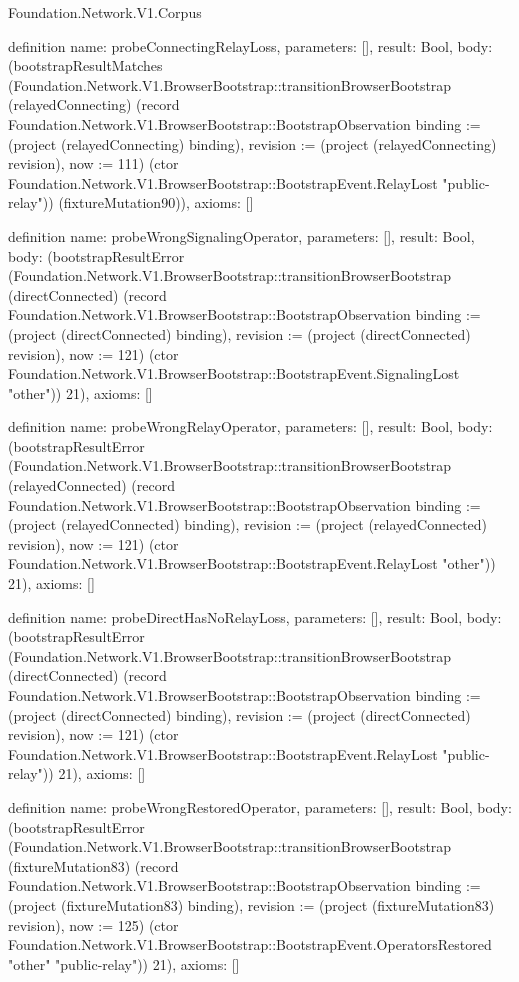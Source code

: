 \begin{lexlean}{Foundation.Network.V1.Corpus}
\begin{semanticmodule}
definition{
  name: probeConnectingRelayLoss,
  parameters: [],
  result: Bool,
  body: (bootstrapResultMatches (Foundation.Network.V1.BrowserBootstrap::transitionBrowserBootstrap (relayedConnecting) (record Foundation.Network.V1.BrowserBootstrap::BootstrapObservation {binding := (project (relayedConnecting) binding), revision := (project (relayedConnecting) revision), now := 111}) (ctor Foundation.Network.V1.BrowserBootstrap::BootstrapEvent.RelayLost "public-relay")) (fixtureMutation90)),
  axioms: []
}

definition{
  name: probeWrongSignalingOperator,
  parameters: [],
  result: Bool,
  body: (bootstrapResultError (Foundation.Network.V1.BrowserBootstrap::transitionBrowserBootstrap (directConnected) (record Foundation.Network.V1.BrowserBootstrap::BootstrapObservation {binding := (project (directConnected) binding), revision := (project (directConnected) revision), now := 121}) (ctor Foundation.Network.V1.BrowserBootstrap::BootstrapEvent.SignalingLost "other")) 21),
  axioms: []
}

definition{
  name: probeWrongRelayOperator,
  parameters: [],
  result: Bool,
  body: (bootstrapResultError (Foundation.Network.V1.BrowserBootstrap::transitionBrowserBootstrap (relayedConnected) (record Foundation.Network.V1.BrowserBootstrap::BootstrapObservation {binding := (project (relayedConnected) binding), revision := (project (relayedConnected) revision), now := 121}) (ctor Foundation.Network.V1.BrowserBootstrap::BootstrapEvent.RelayLost "other")) 21),
  axioms: []
}

definition{
  name: probeDirectHasNoRelayLoss,
  parameters: [],
  result: Bool,
  body: (bootstrapResultError (Foundation.Network.V1.BrowserBootstrap::transitionBrowserBootstrap (directConnected) (record Foundation.Network.V1.BrowserBootstrap::BootstrapObservation {binding := (project (directConnected) binding), revision := (project (directConnected) revision), now := 121}) (ctor Foundation.Network.V1.BrowserBootstrap::BootstrapEvent.RelayLost "public-relay")) 21),
  axioms: []
}

definition{
  name: probeWrongRestoredOperator,
  parameters: [],
  result: Bool,
  body: (bootstrapResultError (Foundation.Network.V1.BrowserBootstrap::transitionBrowserBootstrap (fixtureMutation83) (record Foundation.Network.V1.BrowserBootstrap::BootstrapObservation {binding := (project (fixtureMutation83) binding), revision := (project (fixtureMutation83) revision), now := 125}) (ctor Foundation.Network.V1.BrowserBootstrap::BootstrapEvent.OperatorsRestored "other" "public-relay")) 21),
  axioms: []
}


\end{semanticmodule}
\end{lexlean}
